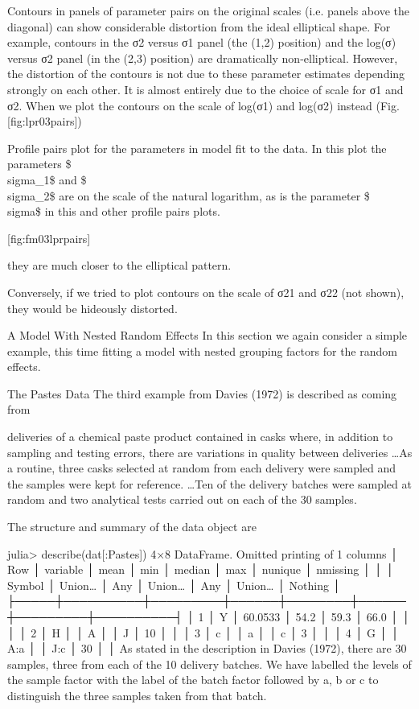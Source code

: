 Contours in panels of parameter pairs on the original scales (i.e. panels above the diagonal) can show considerable distortion from the ideal elliptical shape. For example, contours in the σ2 versus σ1 panel (the (1,2) position) and the log(σ) versus σ2 panel (in the (2,3) position) are dramatically non-elliptical. However, the distortion of the contours is not due to these parameter estimates depending strongly on each other. It is almost entirely due to the choice of scale for σ1 and σ2. When we plot the contours on the scale of log(σ1) and log(σ2) instead (Fig. [fig:lpr03pairs])

Profile pairs plot for the parameters in model fit to the data. In this plot the parameters \$\\sigma_1\$ and \$\\sigma_2\$ are on the scale of the natural logarithm, as is the parameter \$\\sigma\$ in this and other profile pairs plots.

[fig:fm03lprpairs]

they are much closer to the elliptical pattern.

Conversely, if we tried to plot contours on the scale of σ21 and σ22 (not shown), they would be hideously distorted.

A Model With Nested Random Effects
In this section we again consider a simple example, this time fitting a model with nested grouping factors for the random effects.

The Pastes Data
The third example from Davies (1972) is described as coming from

deliveries of a chemical paste product contained in casks where, in addition to sampling and testing errors, there are variations in quality between deliveries …As a routine, three casks selected at random from each delivery were sampled and the samples were kept for reference. …Ten of the delivery batches were sampled at random and two analytical tests carried out on each of the 30 samples.

The structure and summary of the data object are

julia> describe(dat[:Pastes])
4×8 DataFrame. Omitted printing of 1 columns
│ Row │ variable │ mean    │ min  │ median │ max  │ nunique │ nmissing │
│     │ Symbol   │ Union…  │ Any  │ Union… │ Any  │ Union…  │ Nothing  │
├─────┼──────────┼─────────┼──────┼────────┼──────┼─────────┼──────────┤
│ 1   │ Y        │ 60.0533 │ 54.2 │ 59.3   │ 66.0 │         │          │
│ 2   │ H        │         │ A    │        │ J    │ 10      │          │
│ 3   │ c        │         │ a    │        │ c    │ 3       │          │
│ 4   │ G        │         │ A:a  │        │ J:c  │ 30      │          │
As stated in the description in Davies (1972), there are 30 samples, three from each of the 10 delivery batches. We have labelled the levels of the sample factor with the label of the batch factor followed by a, b or c to distinguish the three samples taken from that batch.

